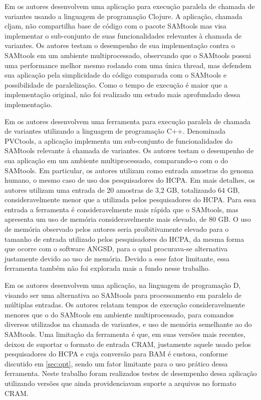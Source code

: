 \documentclass[cic,tc]{iiufrgs}
\begin{document}
Em \cite{takeuchi2016cljam} os autores desenvolvem uma aplicação para execução
paralela de chamada de variantes usando a linguagem de programação Clojure. A
aplicação, chamada cljam, não compartilha base de código com o pacote SAMtools
mas visa implementar o sub-conjunto de suas funcionalidades relevantes à
chamada de variantes. Os autores testam o desempenho de sua implementação
contra o SAMtools em um ambiente multiprocessado, observando que o SAMtools
possui uma performance melhor mesmo rodando com uma única thread, mas defendem
sua aplicação pela simplicidade do código comparada com o SAMtools e
possibilidade de paralelização. Como o tempo de execução é maior que a
implementação original, não foi realizado um estudo mais aprofundado dessa
implementação.

Em \cite{jin2019pvctools} os autores desenvolvem uma ferramenta para execução
paralela de chamada de variantes utilizando a linguagem de programação C++.
Denominada PVCtools, a aplicação implementa um sub-conjunto de funcionalidades
do SAMtools relevante à chamada de variantes. Os autores testam o desempenho de
sua aplicação em um ambiente multiprocessado, comparando-o com o do SAMtools.
Em particular, os autores utilizam como entrada amostras do genoma humano,
o mesmo caso de uso dos pesquisadores do HCPA. Em mais detalhes, os
autores utilizam uma entrada de 20 amostras de 3,2 GB, totalizando 64 GB,
consideravelmente menor que a utilizada pelos pesquisadores do HCPA. Para essa
entrada a ferramenta é consideravelmente mais rápida que o SAMtools, mas
apresenta um uso de memória consideravelmente mais elevado, de 80 GB. O uso de
memória observado pelos autores seria proibitivamente elevado para o tamanho de
entrada utilizado pelos pesquisadores do HCPA, da mesma forma que ocorre com o
software ANGSD, para o qual procurava-se alternativa justamente devido ao uso
de memória. Devido a esse fator limitante, essa ferramenta também não foi
explorada mais a fundo nesse trabalho.

Em \cite{tarasov2015sambamba} os autores desenvolvem uma aplicação, na
linguagem de programação D, visando ser uma alternativa ao SAMtools para
processamento em paralelo de múltiplas entradas. Os autores relatam tempos de
execução consideravelmente menores que o do SAMtools em ambiente
multiprocessado, para comandos diversos utilizados na chamada de variantes, e
uso de memória semelhante ao do SAMtools. Uma limitação da ferramenta é que, em
suas versões mais recentes, deixou de suportar o formato de entrada CRAM,
justamente aquele usado pelos pesquisadores do HCPA e cuja conversão para BAM é
custosa, conforme discutido em \ref{sec:opt}, sendo um fator limitante para o
uso prático dessa ferramenta. Neste trabalho foram realizados testes de
desempenho dessa aplicação utilizando versões que ainda providenciavam suporte
a arquivos no formato CRAM.
\end{document}
